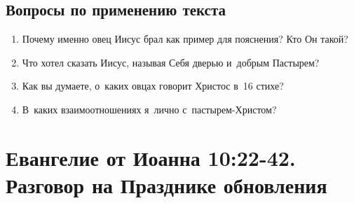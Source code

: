 \documentclass[a4paper,12pt]{article}
\begin{document}
\subsection*{Вопросы по применению текста} 
\begin{enumerate}
    \item Почему именно овец Иисус брал как пример для пояснения? Кто Он такой? 
    
    \myline
    
    \myline
    \item Что хотел сказать Иисус, называя Себя дверью и~добрым Пастырем? 
    
    \myline
    
    \myline
    \item Как вы думаете, о~каких овцах говорит Христос в~16 стихе? 
    
    \myline
    
    \myline
    \item В~каких взаимоотношениях я~лично с~пастырем-Христом? 
    
    \myline
    
    \myline
\end{enumerate}


\section{Евангелие от Иоанна 10:22-42. Разговор на Празднике обновления}
\end{document}
